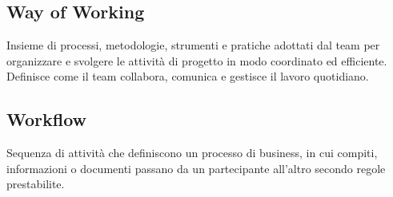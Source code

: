 \documentclass[a4paper,11pt]{article}
\begin{document}
\subsection{Way of Working}
Insieme di processi, metodologie, strumenti e pratiche adottati dal team per organizzare e svolgere le attività di progetto in modo coordinato ed efficiente. Definisce come il team collabora, comunica e gestisce il lavoro quotidiano.









\subsection{Workflow}
Sequenza di attività che definiscono un processo di business, in cui compiti, informazioni o documenti passano da un partecipante all'altro secondo regole prestabilite.
\end{document}
